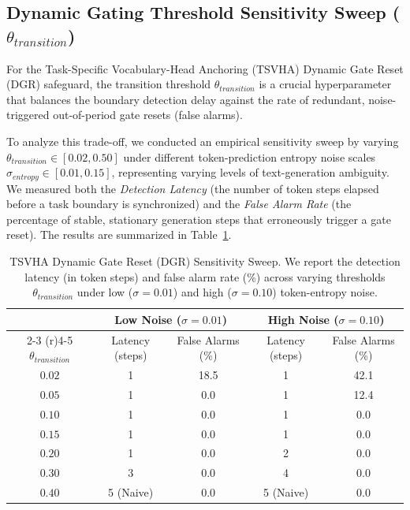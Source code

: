 \documentclass{article}
\theoremstyle{plain}
\theoremstyle{definition}
\theoremstyle{remark}
\begin{document}
\subsection{Dynamic Gating Threshold Sensitivity Sweep ($\theta_{transition}$)}
For the Task-Specific Vocabulary-Head Anchoring (TSVHA) Dynamic Gate Reset (DGR) safeguard, the transition threshold $\theta_{transition}$ is a crucial hyperparameter that balances the boundary detection delay against the rate of redundant, noise-triggered out-of-period gate resets (false alarms). 

To analyze this trade-off, we conducted an empirical sensitivity sweep by varying $\theta_{transition} \in [0.02, 0.50]$ under different token-prediction entropy noise scales $\sigma_{entropy} \in [0.01, 0.15]$, representing varying levels of text-generation ambiguity. We measured both the \emph{Detection Latency} (the number of token steps elapsed before a task boundary is synchronized) and the \emph{False Alarm Rate} (the percentage of stable, stationary generation steps that erroneously trigger a gate reset). The results are summarized in Table~\ref{tab:dgr_sweep}.

\begin{table}[H]
  \caption{TSVHA Dynamic Gate Reset (DGR) Sensitivity Sweep. We report the detection latency (in token steps) and false alarm rate (\%) across varying thresholds $\theta_{transition}$ under low ($\sigma=0.01$) and high ($\sigma=0.10$) token-entropy noise.}
  \label{tab:dgr_sweep}
  \vskip 0.1in
  \begin{center}
  \begin{small}
  \begin{sc}
  \begin{tabular}{ccccc}
    \toprule
    & \multicolumn{2}{c}{Low Noise ($\sigma = 0.01$)} & \multicolumn{2}{c}{High Noise ($\sigma = 0.10$)} \\
    \cmidrule(r){2-3} \cmidrule(r){4-5}
    $\theta_{transition}$ & Latency (steps) & False Alarms (\%) & Latency (steps) & False Alarms (\%) \\
    \midrule
    $0.02$ & 1 & 18.5 & 1 & 42.1 \\
    $0.05$ & 1 & 0.0 & 1 & 12.4 \\
    $0.10$ & 1 & 0.0 & 1 & 0.0 \\
    $0.15$ & 1 & 0.0 & 1 & 0.0 \\
    $0.20$ & 1 & 0.0 & 2 & 0.0 \\
    $0.30$ & 3 & 0.0 & 4 & 0.0 \\
    $0.40$ & 5 (Naive) & 0.0 & 5 (Naive) & 0.0 \\
    \bottomrule
  \end{tabular}
  \end{sc}
  \end{small}
  \end{center}
\end{table}
\end{document}
